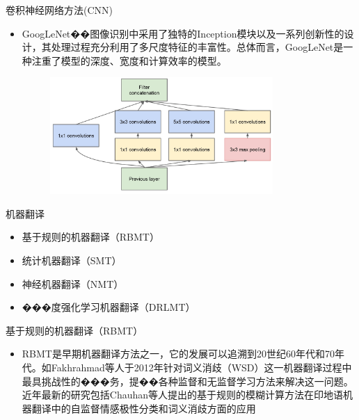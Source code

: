 \documentclass[UTF8,AutoFakeBold,AutoFakeSlant]{beamer}
\begin{document}
\begin{frame}{卷积神经网络方法(CNN)}
    \scriptsize
    \begin{itemize}
        \item GoogLeNet��图像识别中采用了独特的Inception模块以及一系列创新性的设计，其处理过程充分利用了多尺度特征的丰富性。总体而言，GoogLeNet是一种注重了模型的深度、宽度和计算效率的模型。

              \begin{figure}[H]
                  \centering
                  \includegraphics[width=0.8\textwidth]{img/2-Image Recognition/5.jpg}
              \end{figure}
    \end{itemize}
\end{frame}

\begin{frame}{机器翻译}
    \begin{itemize}
        \item 基于规则的机器翻译（RBMT）
        \item 统计机器翻译（SMT）
        \item 神经机器翻译（NMT）
        \item ���度强化学习机器翻译（DRLMT）
    \end{itemize}
\end{frame}

\begin{frame}{基于规则的机器翻译（RBMT）}
    \begin{itemize}
        \item RBMT是早期机器翻译方法之一，它的发展可以追溯到20世纪60年代和70年代。如Fakhrahmad等人于2012年针对词义消歧（WSD）这一机器翻译过程中最具挑战性的���务，提��各种监督和无监督学习方法来解决这一问题。近年最新的研究包括Chauhan等人提出的基于规则的模糊计算方法在印地语机器翻译中的自监督情感极性分类和词义消歧方面的应用
    \end{itemize}
\end{frame}
\end{document}
